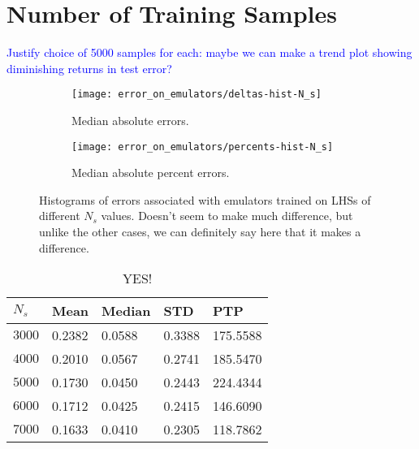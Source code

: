 \section{Number of Training Samples}
\label{sec: num_samples}

\textcolor{blue}{Justify choice of 5000 samples for each: maybe we can make a
trend plot showing diminishing returns in test error?}

\begin{figure}[ht!]
    \begin{subfigure}{0.35 \textheight}
    \centering
 		\texttt{[image: error\_on\_emulators/deltas-hist-N\_s]}
 		\caption{Median absolute errors.}
 		\label{fig: Ns_experiment_deltas}
    \end{subfigure}
    \begin{subfigure}{0.35 \textheight}
    \centering
 		\texttt{[image: error\_on\_emulators/percents-hist-N\_s]}
 		\caption{Median absolute percent errors.}
 		\label{fig: Ns_experiment_percerr}
    \end{subfigure}
        \centering
    \caption[Impact of $s^*$ on Accuracy]
    		{Histograms of errors associated with emulators trained on LHSs of
    			different $N_s$ values. Doesn't seem to make much difference,
    			but unlike the other cases, we can definitely say here that it
    			makes a difference.}
    \label{fig: Ns_experiment}
\end{figure}

\begin{table}[ht!]
\centering
\begin{tabular}{l|l|l|l|l}
\hline
$N_s$ & Mean & Median & STD & PTP \\ \hline
$3000$ & 0.2382 & 0.0588 & 0.3388 & 175.5588 \\
$4000$ & 0.2010 & 0.0567 & 0.2741 & 185.5470 \\
$5000$ & 0.1730 & 0.0450 & 0.2443 & 224.4344 \\
$6000$ & 0.1712 & 0.0425 & 0.2415 & 146.6090 \\
$7000$ & 0.1633 & 0.0410 & 0.2305 & 118.7862 \\
\end{tabular}
	\cprotect\caption[$N_s$ Experiment: Deltas Statistics]{YES!}
 \label{tab: Ns_experiment_deltas_stats}
\end{table}

